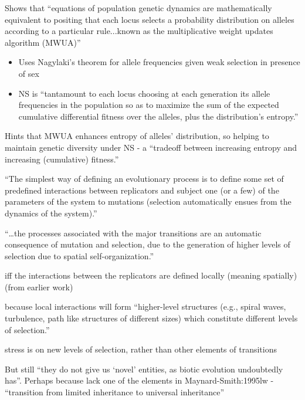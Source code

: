 	
	Shows that ``equations of population genetic dynamics are
	mathematically equivalent to positing that each locus selects a
	probability distribution on alleles according to a particular
	rule...known as the multiplicative weight updates algorithm (MWUA)''
	
	
	\begin{itemize}
		\item
		
		Uses Nagylaki's theorem for allele frequencies given weak selection
		in presence of sex
		
		\item
		
		NS is ``tantamount to each locus choosing at each generation its
		allele frequencies in the population so as to maximize the sum of
		the expected cumulative differential fitness over the alleles, plus
		the distribution's entropy.''
		
	\end{itemize}

	
	Hints that MWUA enhances entropy of alleles' distribution, so helping
	to maintain genetic diversity under NS - a ``tradeoff between
	increasing entropy and increasing (cumulative) fitness.''
	

	
\autocite{Hogeweg1998}

			``The simplest way of defining an evolutionary process is to define
			some set of predefined interactions between replicators and subject
			one (or a few) of the parameters of the system to mutations (selection
			automatically ensues from the dynamics of the system).''

			
			``\ldots{}the processes associated with the major transitions are an
			automatic consequence of mutation and selection, due to the generation
			of higher levels of selection due to spatial self-organization.''
			

				iff the interactions between the replicators are defined locally
				(meaning spatially) (from earlier work)
				

				because local interactions will form ``higher-level structures
				(e.g., spiral waves, turbulence, path like structures of different
				sizes) which constitute different levels of selection.''
	
				stress is on new levels of selection, rather than other elements of
				transitions

				
				But still ``they do not give us `novel' entities, as biotic
				evolution undoubtedly has''. Perhaps because lack one of the elements in Maynard-Smith:1995lw -
					``transition from limited inheritance to universal inheritance''
					

